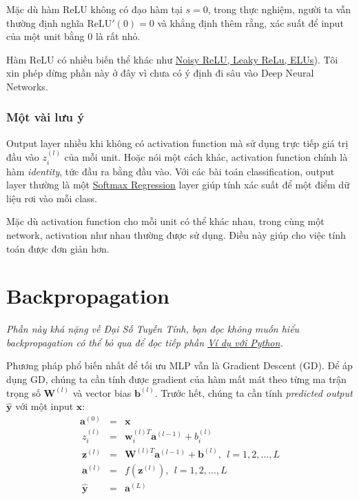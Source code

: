 \item Mặc dù hàm ReLU không có đạo hàm tại $s = 0$, trong thực nghiệm, người ta vẫn thường định nghĩa $\text{ReLU}'(0) = 0$ và khẳng định thêm rằng, xác suất để input của một unit bằng 0 là rất nhỏ. 
 
 
Hàm ReLU có nhiều biến thể khác như \href{https://en.wikipedia.org/wiki/Rectifier_(neural_networks}{Noisy ReLU, Leaky ReLu, ELUs}). Tôi xin phép dừng phần này ở đây vì chưa có ý định đi sâu vào Deep Neural Networks. 
 
 
\subsubsection{Một vài lưu ý}
 
\item Output layer nhiều khi không có activation function mà sử dụng trực tiếp giá trị đầu vào $z_i^{(l)}$ của mỗi unit. Hoặc nói một cách khác, activation function chính là hàm \textit{identity}, tức đầu ra bằng đầu vào. Với các bài toán classification, output layer thường là một \href{http://machinelearningcoban.com/2017/02/17/softmax/}{Softmax Regression} layer giúp tính xác suất để một điểm dữ liệu rơi vào mỗi class. 
 
\item Mặc dù activation function cho mỗi unit có thể khác nhau, trong cùng một network, activation như nhau thường được sử dụng. Điều này giúp cho việc tính toán được đơn giản hơn. 
 
 
 
\section{Backpropagation}
\textit{Phần này khá nặng về Đại Số Tuyến Tính, bạn đọc không muốn hiểu backpropagation có thể bỏ qua để đọc tiếp phần \href{http://machinelearningcoban.com#-vi-du-tren-python}{Ví dụ với Python}.} 
 
Phương pháp phổ biến nhất để tối ưu MLP vẫn là Gradient Descent (GD). Để áp dụng GD, chúng ta cần tính được gradient của hàm mất mát theo từng ma trận trọng số $\mathbf{W}^{(l)}$ và vector bias $\mathbf{b}^{(l)}$. Trước hết, chúng ta cần tính \textit{predicted output} $ \mathbf{\hat{y}}$  với một input $\mathbf{x}$: 
\begin{equation*} 
\begin{eqnarray} 
\mathbf{a}^{(0)} &=& \mathbf{x} \\\ 
z_{i}^{(l)} &=& \mathbf{w}_i^{(l)T}\mathbf{a}^{(l-1)} + b_i^{(l)} \\\ 
\mathbf{z}^{(l)}  &=& \mathbf{W}^{(l)T}\mathbf{a}^{(l-1)} + \mathbf{b}^{(l)},~~ l =  1, 2, \dots, L \\\ 
\mathbf{a}^{(l)} &=& f(\mathbf{z}^{(l)}), ~~ l =  1, 2, \dots, L \\\ 
\mathbf{\hat{y}} &=& \mathbf{a}^{(L)} 
\end{eqnarray} 
\end{equation*} 
 
